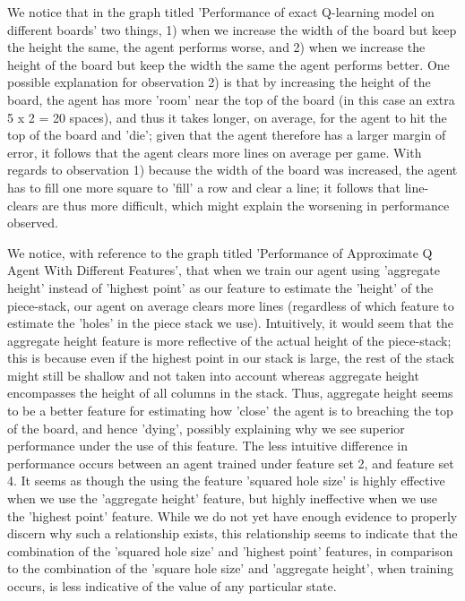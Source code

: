 \documentclass[10pt]{article}
\begin{document}
\bigskip

We notice that in the graph titled 'Performance of exact Q-learning model on different boards' two things, 1) when we increase the width of the board but keep the height the same, the agent performs worse, and 2) when we increase the height of the board but keep the width the same the agent performs better. One possible explanation for observation 2) is that by increasing the height of the board, the agent has more 'room' near the top of the board (in this case an extra 5 x 2 = 20 spaces), and thus it takes longer, on average, for the agent to hit the top of the board and 'die'; given that the agent therefore has a larger margin of error, it follows that the agent clears more lines on average per game. With regards to observation 1) because the width of the board was increased, the agent has to fill one more square to 'fill' a row and clear a line; it follows that line-clears are thus more difficult, which might explain the worsening in performance observed.

\bigskip
We notice, with reference to the graph titled 'Performance of Approximate Q Agent With Different Features', that when we train our agent using 'aggregate height' instead of 'highest point' as our feature to estimate the 'height' of the piece-stack, our agent on average clears more lines (regardless of which feature to estimate the 'holes' in the piece stack we use). Intuitively, it would seem that the aggregate height feature is more reflective of the actual height of the piece-stack; this is because even if the highest point in our stack is large, the rest of the stack might still be shallow and not taken into account whereas aggregate height encompasses the height of all columns in the stack. Thus, aggregate height seems to be a better feature for estimating how 'close' the agent is to breaching the top of the board, and hence 'dying', possibly explaining why we see superior performance under the use of this feature. The less intuitive difference in performance occurs between an agent trained under feature set 2, and feature set 4. It seems as though the using the feature 'squared hole size' is highly effective when we use the 'aggregate height' feature, but highly ineffective when we use the 'highest point' feature. While we do not yet have enough evidence to properly discern why such a relationship exists, this relationship seems to indicate that the combination of the 'squared hole size' and 'highest point' features, in comparison to the combination of the 'square hole size' and 'aggregate height', when training occurs, is less indicative of the value of any particular state.
\end{document}
